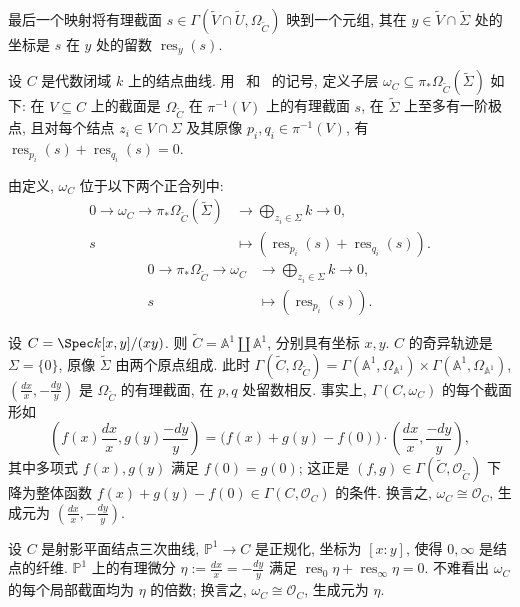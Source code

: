 最后一个映射将有理截面 $s\in\Gamma(\widetilde V\cap\widetilde U,\allowbreak \Omega_{\widetilde C})$ 映到一个元组, 其在 $y\in\widetilde V\cap\widetilde\Sigma$ 处的坐标是 $s$ 在 $y$ 处的留数 $\operatorname{res}_y(s)$.
\begin{definition}[对偶化层]\label{src:6.2.18}
设 $C$ 是代数闭域 $k$ 上的结点曲线. 用~ 和~ 的记号, 定义子层 $\omega_C\subseteq\pi_*\Omega_{\widetilde C}(\widetilde\Sigma)$ 如下: 在 $V\subseteq C$ 上的截面是 $\Omega_{\widetilde C}$ 在 $\pi^{-1}(V)$ 上的有理截面 $s$, 在 $\widetilde\Sigma$ 上至多有一阶极点, 且对每个结点 $z_i\in V\cap\Sigma$ 及其原像 $p_i,\allowbreak q_i\in\pi^{-1}(V)$, 有 $\operatorname{res}_{p_i}(s)+\operatorname{res}_{q_i}(s)=0$.
\end{definition}
由定义, $\omega_C$ 位于以下两个正合列中:
\[
\begin{aligned}
0\to\omega_C\to\pi_*\Omega_{\widetilde C}(\widetilde\Sigma)&\to\bigoplus_{z_i\in\Sigma}k\to0,\\
s&\mapsto(\operatorname{res}_{p_i}(s)+\operatorname{res}_{q_i}(s)).
\end{aligned}
\]
\[
\begin{aligned}
0\to\pi_*\Omega_{\widetilde C}\to\omega_C&\to\bigoplus_{z_i\in\Sigma}k\to0,\\
s&\mapsto(\operatorname{res}_{p_i}(s)).
\end{aligned}
\]
\begin{example}[局部计算]\label{src:6.2.19}
设 $C=\Spec k[x,\allowbreak y]/(xy)$. 则 $\widetilde C=\mathbb A^1\coprod\mathbb A^1$, 分别具有坐标 $x,\allowbreak y$. $C$ 的奇异轨迹是 $\Sigma=\{0\}$, 原像 $\widetilde\Sigma$ 由两个原点组成. 此时 $\Gamma(\widetilde C,\allowbreak \Omega_{\widetilde C})=\Gamma(\mathbb A^1,\allowbreak \Omega_{\mathbb A^1})\times\Gamma(\mathbb A^1,\allowbreak \Omega_{\mathbb A^1})$, $(\frac{dx}{x},\allowbreak -\frac{dy}{y})$ 是 $\Omega_{\widetilde C}$ 的有理截面, 在 $p,\allowbreak q$ 处留数相反. 事实上, $\Gamma(C,\allowbreak \omega_C)$ 的每个截面形如
\[
\left(f(x)\frac{dx}{x},g(y)\frac{-dy}{y}\right)=\bigl(f(x)+g(y)-f(0)\bigr)\cdot\left(\frac{dx}{x},\frac{-dy}{y}\right),
\]
其中多项式 $f(x),\allowbreak g(y)$ 满足 $f(0)=g(0)$; 这正是 $(f,\allowbreak g)\in\Gamma(\widetilde C,\allowbreak \mathcal O_{\widetilde C})$ 下降为整体函数 $f(x)+g(y)-f(0)\in\Gamma(C,\allowbreak \mathcal O_C)$ 的条件. 换言之, $\omega_C\cong\mathcal O_C$, 生成元为 $(\frac{dx}{x},\allowbreak -\frac{dy}{y})$.
\end{example}
\begin{example}\label{src:6.2.20}
设 $C$ 是射影平面结点三次曲线, $\mathbb P^1\to\allowbreak C$ 是正规化, 坐标为 $[x:y]$, 使得 $0,\allowbreak \infty$ 是结点的纤维. $\mathbb P^1$ 上的有理微分 $\eta:=\frac{dx}{x}=-\frac{dy}{y}$ 满足 $\operatorname{res}_0\eta+\operatorname{res}_{\infty}\eta=0$. 不难看出 $\omega_C$ 的每个局部截面均为 $\eta$ 的倍数; 换言之, $\omega_C\cong\mathcal O_C$, 生成元为 $\eta$.
\end{example}
